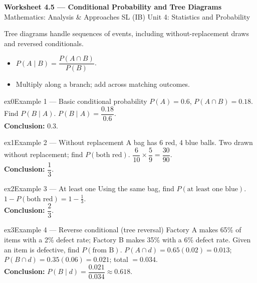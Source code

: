 \documentclass[11pt]{article}
\begin{document}
\begin{center}
{\LARGE\bfseries\color{titleblue}Worksheet 4.5 --- Conditional Probability and Tree Diagrams}\\[2pt]
{\small Mathematics: Analysis \& Approaches SL (IB) \textperiodcentered{} Unit 4: Statistics and Probability}
\end{center}

\begin{ideabox}
Tree diagrams handle sequences of events, including without-replacement draws and reversed conditionals.
\begin{itemize}[leftmargin=*,itemsep=2pt]
  \item $P(A\mid B)=\dfrac{P(A\cap B)}{P(B)}$.
  \item Multiply along a branch; add across matching outcomes.
\end{itemize}
\end{ideabox}


\begin{example}{ex0}{Example 1 --- Basic conditional probability}
$P(A)=0.6$, $P(A\cap B)=0.18$. Find $P(B\mid A)$.\soln
$P(B\mid A)=\dfrac{0.18}{0.6}$.\\[3pt]\textbf{Conclusion:} $0.3$.
\end{example}

\begin{example}{ex1}{Example 2 --- Without replacement}
A bag has 6 red, 4 blue balls. Two drawn without replacement; find $P(\text{both red})$.\soln
$\dfrac6{10}\times\dfrac59=\dfrac{30}{90}$.\\[3pt]\textbf{Conclusion:} $\dfrac13$.
\end{example}

\begin{example}{ex2}{Example 3 --- At least one}
Using the same bag, find $P(\text{at least one blue})$.\soln
$1-P(\text{both red})=1-\tfrac13$.\\[3pt]\textbf{Conclusion:} $\dfrac23$.
\end{example}

\begin{example}{ex3}{Example 4 --- Reverse conditional (tree reversal)}
Factory A makes 65\% of items with a 2\% defect rate; Factory B makes 35\% with a 6\% defect rate. Given an item is defective, find $P(\text{from B})$.\soln
$P(A\cap d)=0.65(0.02)=0.013$; $P(B\cap d)=0.35(0.06)=0.021$; total $=0.034$.\\[3pt]\textbf{Conclusion:} $P(B\mid d)=\dfrac{0.021}{0.034}\approx0.618$.
\end{example}
\end{document}
